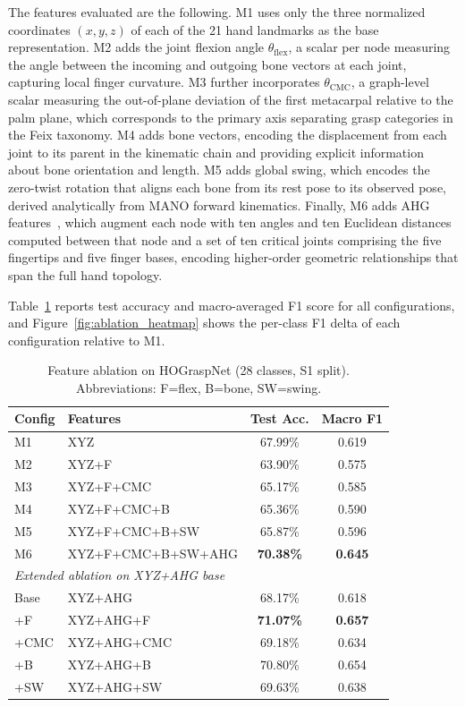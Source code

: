 \documentclass[letterpaper, 10 pt, conference]{ieeeconf}  %
\begin{document}
The features evaluated are the following. M1 uses only the three normalized coordinates $(x, y, z)$ of each of the 21 hand landmarks as the base representation. M2 adds the joint flexion angle $\theta_\text{flex}$, a scalar per node measuring the angle between the incoming and outgoing bone vectors at each joint, capturing local finger curvature. M3 further incorporates $\theta_\text{CMC}$, a graph-level scalar measuring the out-of-plane deviation of the first metacarpal relative to the palm plane, which corresponds to the primary axis separating grasp categories in the Feix taxonomy. M4 adds bone vectors, encoding the displacement from each joint to its parent in the kinematic chain and providing explicit information about bone orientation and length. M5 adds global swing, which encodes the zero-twist rotation that aligns each bone from its rest pose to its observed pose, derived analytically from MANO forward kinematics. Finally, M6 adds AHG features~\cite{aiman_ahg2024}, which augment each node with ten angles and ten Euclidean distances computed between that node and a set of ten critical joints comprising the five fingertips and five finger bases, encoding higher-order geometric relationships that span the full hand topology.

Table~\ref{tab:ablation} reports test accuracy and macro-averaged F1 score for all configurations, and Figure~\ref{fig:ablation_heatmap} shows the per-class F1 delta of each configuration relative to M1.

\begin{table}[h]
\centering
\caption{Feature ablation on HOGraspNet (28 classes, S1 split). Abbreviations: F=flex, B=bone, SW=swing.}
\label{tab:ablation}
\small
\setlength{\tabcolsep}{4pt}
\begin{tabular}{llcc}
\toprule
Config & Features & Test Acc. & Macro F1 \\
\midrule
M1 & XYZ                                    & 67.99\% & 0.619 \\
M2 & XYZ+F                                  & 63.90\% & 0.575 \\
M3 & XYZ+F+CMC                              & 65.17\% & 0.585 \\
M4 & XYZ+F+CMC+B                            & 65.36\% & 0.590 \\
M5 & XYZ+F+CMC+B+SW                         & 65.87\% & 0.596 \\
M6 & XYZ+F+CMC+B+SW+AHG                     & \textbf{70.38\%} & \textbf{0.645} \\
\midrule
\multicolumn{4}{l}{\textit{Extended ablation on XYZ+AHG base}} \\
Base & XYZ+AHG                              & 68.17\% & 0.618 \\
+F & XYZ+AHG+F                              & \textbf{71.07\%} & \textbf{0.657} \\
+CMC & XYZ+AHG+CMC                          & 69.18\% & 0.634 \\
+B & XYZ+AHG+B                              & 70.80\% & 0.654 \\
+SW & XYZ+AHG+SW                            & 69.63\% & 0.638 \\
\bottomrule
\end{tabular}
\end{table}
\end{document}

